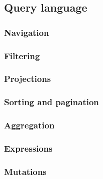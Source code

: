 
\subsection{Query language}

\subsubsection{Navigation}

\subsubsection{Filtering}

\subsubsection{Projections}

\subsubsection{Sorting and pagination}

\subsubsection{Aggregation}

\subsubsection{Expressions}

\subsubsection{Mutations}

